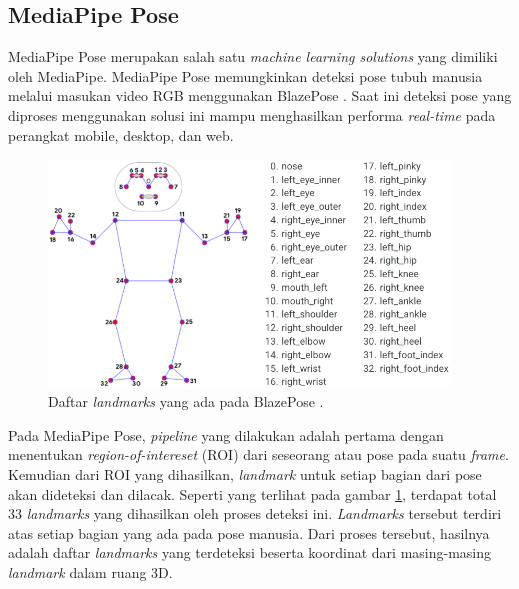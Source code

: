 \subsection{MediaPipe Pose}
\label{subsec:mediapipepose}

MediaPipe Pose merupakan salah satu \emph{machine learning solutions} yang dimiliki oleh MediaPipe.
MediaPipe Pose memungkinkan deteksi pose tubuh manusia melalui masukan video RGB menggunakan BlazePose \citep{cit:bazarevsky2020}.
Saat ini deteksi pose yang diproses menggunakan solusi ini mampu menghasilkan performa \emph{real-time} pada perangkat mobile, desktop, dan web.

\begin{figure}[ht]
  \centering
  \includegraphics[width=0.95\textwidth,keepaspectratio]{gambar/landmarks-mediapipe-pose.png}
  \caption{Daftar \emph{landmarks} yang ada pada BlazePose \citep{cit:bazarevsky2020}.}
  \label{fig:landmarksmediapipepose}
\end{figure}

Pada MediaPipe Pose,\emph{ pipeline} yang dilakukan adalah pertama dengan menentukan \emph{region-of-intereset} (ROI) dari seseorang atau pose pada suatu \emph{frame}.
Kemudian dari ROI yang dihasilkan, \emph{landmark} untuk setiap bagian dari pose akan dideteksi dan dilacak.
Seperti yang terlihat pada gambar \ref{fig:landmarksmediapipepose},
  terdapat total 33 \emph{landmarks} yang dihasilkan oleh proses deteksi ini.
\emph{Landmarks} tersebut terdiri atas setiap bagian yang ada pada pose manusia.
Dari proses tersebut, hasilnya adalah daftar \emph{landmarks} yang terdeteksi beserta koordinat dari masing-masing \emph{landmark} dalam ruang 3D.
